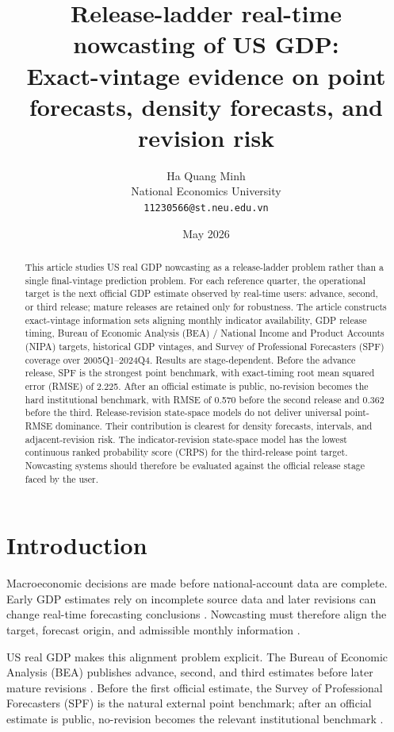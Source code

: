 \documentclass[12pt]{article}
\title{Release-ladder real-time nowcasting of US GDP:\\
Exact-vintage evidence on point forecasts, density forecasts, and revision risk}
\author{
Ha Quang Minh\\
National Economics University\\
\texttt{11230566@st.neu.edu.vn}
}
\date{May 2026}
\begin{document}
\maketitle
\thispagestyle{fancy}

\begin{abstract}
\noindent
This article studies US real GDP nowcasting as a release-ladder problem rather than a single final-vintage prediction problem. For each reference quarter, the operational target is the next official GDP estimate observed by real-time users: advance, second, or third release; mature releases are retained only for robustness. The article constructs exact-vintage information sets aligning monthly indicator availability, GDP release timing, Bureau of Economic Analysis (BEA) / National Income and Product Accounts (NIPA) targets, historical GDP vintages, and Survey of Professional Forecasters (SPF) coverage over 2005Q1--2024Q4. Results are stage-dependent. Before the advance release, SPF is the strongest point benchmark, with exact-timing root mean squared error (RMSE) of 2.225. After an official estimate is public, no-revision becomes the hard institutional benchmark, with RMSE of 0.570 before the second release and 0.362 before the third. Release-revision state-space models do not deliver universal point-RMSE dominance. Their contribution is clearest for density forecasts, intervals, and adjacent-revision risk. The indicator-revision state-space model has the lowest continuous ranked probability score (CRPS) for the third-release point target. Nowcasting systems should therefore be evaluated against the official release stage faced by the user.
\end{abstract}

\section{Introduction}
\label{sec:introduction}

Macroeconomic decisions are made before national-account data are complete. Early GDP estimates rely on incomplete source data and later revisions can change real-time forecasting conclusions \citep{landefeld2008,croushorestark2001,croushore2011}. Nowcasting must therefore align the target, forecast origin, and admissible monthly information \citep{giannone2008,banbura2013,bok2018}.

US real GDP makes this alignment problem explicit. The Bureau of Economic Analysis (BEA) publishes advance, second, and third estimates before later mature revisions \citep{beaNIPA2026,philadelphiaRTDSM2026}. Before the first official estimate, the Survey of Professional Forecasters (SPF) is the natural external point benchmark; after an official estimate is public, no-revision becomes the relevant institutional benchmark \citep{spf2026,anesti2022,mankiwshapiro1986}.
\end{document}
